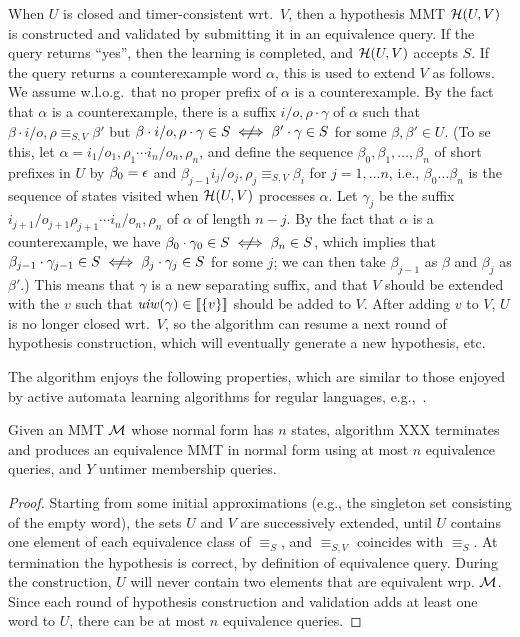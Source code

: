 When $U$ is closed and timer-consistent wrt.\ $V$, then
a hypothesis MMT $\mathcal{H}(U,V)$ is constructed and
validated by submitting it in an equivalence query.
If the query returns ``yes'', then
the learning is completed, and $\mathcal{H}(U,V)$ accepts $S$.
If the query returns a counterexample word $\alpha$, this is used to extend
$V$ as follows. We assume w.l.o.g.\ that no proper prefix of $\alpha$ is
a counterexample. 
By the fact that $\alpha$ is a counterexample, there is a suffix
$i/o,\rho \cdot \gamma$ of $\alpha$
such that $\beta\cdot i/o,\rho \equiv_{S,V} \beta'$ but
$\beta \cdot i/o,\rho \cdot \gamma \in S \notiff \beta' \cdot \gamma \in S$
for some $\beta,\beta' \in U$.
(To se this, let $\alpha = i_1/o_1,\rho_1 \cdots i_n/o_n,\rho_n$, and
define the sequence $\beta_0, \beta_1, \ldots ,\beta_{n}$ of short prefixes
in $U$ by $\beta_0 = \epsilon$ and
$\beta_{j-1}i_j/o_j,\rho_j \equiv_{S,V} \beta_{i}$ for
$j = 1, \ldots n$, i.e., $\beta_0 \ldots \beta_n$ is the sequence of states
visited when $\mathcal{H}(U,V)$ processes $\alpha$.
Let $\gamma_j$ be the suffix $i_{j+1}/o_{j+1}\rho_{j+1} \cdots i_n/o_n,\rho_n$
of $\alpha$ of length $n-j$. 
By the fact that $\alpha$ is a counterexample, we have
$\beta_0\cdot\gamma_0 \in S \notiff  \beta_{n} \in S$, which implies that
$\beta_{j-1}\cdot\gamma_{j-1} \in S \notiff \beta_j\cdot\gamma_j \in S$
for some $j$;
we can then take $\beta_{j-1}$ as $\beta$ and $\beta_j$ as $\beta'$.)
This means that $\gamma$ is a new separating suffix, and that $V$ should be
extended with the $v$ such that
$\mathit{uiw}(\gamma) \in [\![ \lbrace v\rbrace ] \! ]$
should be added to
$V$. After adding $v$ to $V$, $U$ is no longer closed
wrt.\ $V$, so the algorithm can resume a next round of
hypothesis construction, which will eventually generate a new hypothesis,
etc.


The algorithm enjoys the following properties, which are similar to those
enjoyed by active automata learning algorithms for regular languages,
e.g.,~\cite{Ang87}.

\begin{theorem}
  \label{thm:alg:termination}
Given an MMT ${\mathcal M}$ whose normal form has $n$ states, 
algorithm XXX terminates and produces an equivalence MMT in normal form
using at most $n$ equivalence queries, and
$Y$ untimer membership queries.
\end{theorem}
   
\begin{proof}
Starting from some initial approximations (e.g., the singleton
set consisting of the empty word), the sets $U$ and $V$ are
successively extended, until $U$ contains one element of each equivalence
class of $\equiv_{S}$, and $\equiv_{S,V}$ coincides with
$\equiv_{S}$. 
At termination the hypothesis is correct, by definition of equivalence query.
During the construction, $U$ will never contain two elements that are
equivalent wrp. ${\mathcal M}$.
Since each round of hypothesis construction and validation adds at least one
word to $U$, there can be at most $n$ equivalence queries.
\end{proof}

